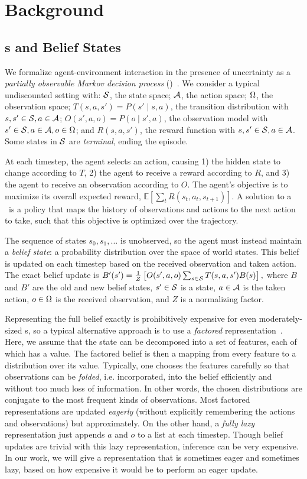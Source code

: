 \section{Background}
\subsection{\pomdp s and Belief States}
We formalize agent-environment interaction in the presence of
uncertainty as a \emph{partially observable Markov decision process}
(\pomdp)~\cite{pomdp}. We consider a typical undiscounted setting
with: $\mathcal{S}$, the state space; $\mathcal{A}$, the action space; $\Omega$, the
observation space; $T(s, a, s') = P(s' \mid s, a)$, the transition
distribution with $s, s' \in \mathcal{S}, a \in \mathcal{A}$;
$O(s', a, o) = P(o \mid s', a)$, the observation model with
$s' \in \mathcal{S}, a \in \mathcal{A}, o \in \Omega$; and $R(s, a, s')$, the reward
function with $s, s' \in \mathcal{S}, a \in \mathcal{A}$. Some states in $\mathcal{S}$ are
\emph{terminal}, ending the episode.

At each timestep, the agent selects an action, causing 1) the hidden
state to change according to $T$, 2) the agent to receive a reward
according to $R$, and 3) the agent to receive an observation according
to $O$. The agent's objective is to maximize its overall expected
reward, $\mathbb{E}\left[\sum_{t}R(s_{t}, a_{t}, s_{t+1})\right]$. A
solution to a \pomdp\ is a policy that maps the history of
observations and actions to the next action to take, such that this
objective is optimized over the trajectory.

The sequence of states $s_{0}, s_{1}, ...$ is unobserved, so the agent
must instead maintain a \emph{belief state}: a probability
distribution over the space of world states. This belief is updated on
each timestep based on the received observation and taken action. The
exact belief update is
$B'(s') = \frac{1}{Z}\left[O(s', a, o) \sum_{s \in \mathcal{S}} T(s, a,
  s')B(s)\right],$ where $B$ and $B'$ are the old and new belief
states, $s' \in \mathcal{S}$ is a state, $a \in \mathcal{A}$ is the taken action,
$o \in \Omega$ is the received observation, and $Z$ is a normalizing
factor.

Representing the full belief exactly is prohibitively expensive
for even moderately-sized \pomdp s, so a typical alternative approach
is to use a \emph{factored} representation~\cite{boyenkoller}. Here, we assume that the
state can be decomposed into a set of features, each of which has a
value. The factored belief is then a mapping from every feature to a
distribution over its value. Typically, one chooses the features
carefully so that observations can be \emph{folded}, i.e.
incorporated, into the belief efficiently and without too much loss of
information. In other words, the chosen distributions are conjugate to
the most frequent kinds of observations. Most factored representations
are updated \emph{eagerly} (without explicitly remembering the actions and
observations) but approximately. On the other hand, a \emph{fully
  lazy} representation just appends $a$ and $o$ to a list at each
timestep. Though belief updates are trivial with this lazy
representation, inference can be very expensive. In our work, we will
give a representation that is sometimes eager and sometimes lazy,
based on how expensive it would be to perform an eager update.


